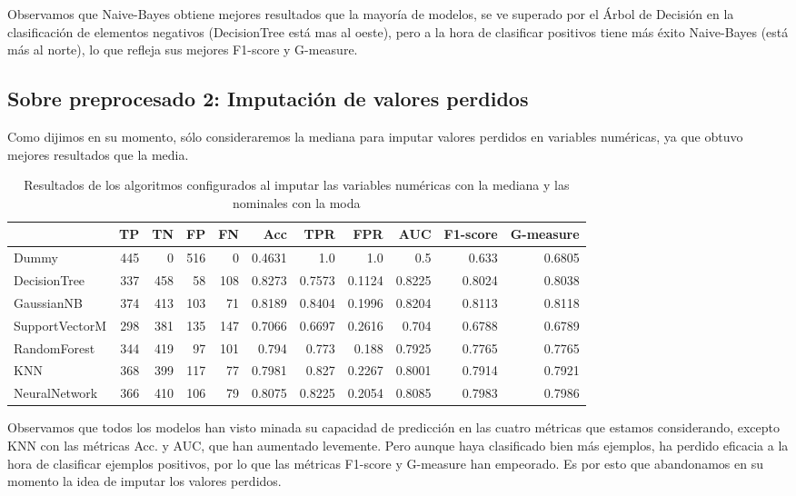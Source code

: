 \documentclass{article}
\begin{document}
Observamos que Naive-Bayes obtiene mejores resultados que la mayoría
de modelos, se ve superado por el Árbol de Decisión en la
clasificación de elementos negativos (DecisionTree está mas al oeste),
pero a la hora de clasificar positivos tiene más éxito Naive-Bayes
(está más al norte), lo que refleja sus mejores F1-score y G-measure.

\subsection{Sobre preprocesado 2: Imputación de valores perdidos}
Como dijimos en su momento, sólo consideraremos la mediana para
imputar valores perdidos en variables numéricas, ya que obtuvo mejores
resultados que la media.

\begin{table}[H]
\centering
\caption{Resultados de los algoritmos configurados al imputar las
  variables numéricas con la mediana y las nominales con la moda}
\label{tab:res-median}
\begin{tabular}{|lrrrrrrrrrr|}
\hline
 & TP & TN & FP & FN & Acc & TPR & FPR & AUC & F1-score & G-measure\\ \hline
Dummy & 445 & 0 & 516 & 0 & 0.4631 & 1.0 & 1.0 & 0.5 & 0.633 & 0.6805\\
DecisionTree & 337 & 458 & 58 & 108 & 0.8273 & 0.7573 & 0.1124 & 0.8225 & 0.8024 & 0.8038\\
GaussianNB & 374 & 413 & 103 & 71 & 0.8189 & 0.8404 & 0.1996 & 0.8204 & 0.8113 & 0.8118\\
SupportVectorM & 298 & 381 & 135 & 147 & 0.7066 & 0.6697 & 0.2616 & 0.704 & 0.6788 & 0.6789\\
RandomForest & 344 & 419 & 97 & 101 & 0.794 & 0.773 & 0.188 & 0.7925 & 0.7765 & 0.7765\\
KNN & 368 & 399 & 117 & 77 & 0.7981 & 0.827 & 0.2267 & 0.8001 & 0.7914 & 0.7921\\
NeuralNetwork & 366 & 410 & 106 & 79 & 0.8075 & 0.8225 & 0.2054 & 0.8085 & 0.7983 & 0.7986\\
\hline
\end{tabular}
\end{table}

Observamos que todos los modelos han visto minada su capacidad de
predicción en las cuatro métricas que estamos considerando, excepto
KNN con las métricas Acc. y AUC, que han aumentado levemente. Pero
aunque haya clasificado bien más ejemplos, ha perdido eficacia a la
hora de clasificar ejemplos positivos, por lo que las métricas
F1-score y G-measure han empeorado. Es por esto que abandonamos en su
momento la idea de imputar los valores perdidos.
\end{document}
